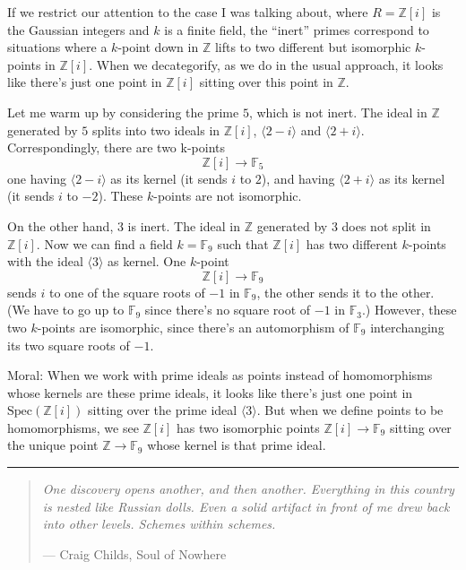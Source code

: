 \documentclass{article}
\begin{document}
If we restrict our attention to the case I was talking about, where
\(R = \mathbb{Z}[i]\) is the Gaussian integers and \(k\) is a finite
field, the ``inert'' primes correspond to situations where a \(k\)-point
down in \(\mathbb{Z}\) lifts to two different but isomorphic
\(k\)-points in \(\mathbb{Z}[i]\). When we decategorify, as we do in the
usual approach, it looks like there's just one point in
\(\mathbb{Z}[i]\) sitting over this point in \(\mathbb{Z}\).

Let me warm up by considering the prime \(5\), which is not inert. The
ideal in \(\mathbb{Z}\) generated by \(5\) splits into two ideals in
\(\mathbb{Z}[i]\), \(\langle 2 - i\rangle\) and
\(\langle 2 + i\rangle\). Correspondingly, there are two k-points
\[\mathbb{Z}[i] \to \mathbb{F}_5\] one having \(\langle 2 - i\rangle\)
as its kernel (it sends \(i\) to \(2\)), and having
\(\langle 2 + i\rangle\) as its kernel (it sends \(i\) to \(-2\)). These
\(k\)-points are not isomorphic.

On the other hand, \(3\) is inert. The ideal in \(\mathbb{Z}\) generated
by \(3\) does not split in \(\mathbb{Z}[i]\). Now we can find a field
\(k = \mathbb{F}_9\) such that \(\mathbb{Z}[i]\) has two different
\(k\)-points with the ideal \(\langle 3\rangle\) as kernel. One
\(k\)-point \[\mathbb{Z}[i] \to \mathbb{F}_9\] sends \(i\) to one of the
square roots of \(-1\) in \(\mathbb{F}_9\), the other sends it to the
other. (We have to go up to \(\mathbb{F}_9\) since there's no square
root of \(-1\) in \(\mathbb{F}_3\).) However, these two \(k\)-points are
isomorphic, since there's an automorphism of \(\mathbb{F}_9\)
interchanging its two square roots of \(-1\).

Moral: When we work with prime ideals as points instead of homomorphisms
whose kernels are these prime ideals, it looks like there's just one
point in \(\mathrm{Spec}(\mathbb{Z}[i])\) sitting over the prime ideal
\(\langle 3\rangle\). But when we define points to be homomorphisms, we
see \(\mathbb{Z}[i]\) has two isomorphic points
\(\mathbb{Z}[i] \to \mathbb{F}_9\) sitting over the unique point
\(\mathbb{Z} \to \mathbb{F}_9\) whose kernel is that prime ideal.

\begin{center}\rule{0.5\linewidth}{0.5pt}\end{center}

\begin{quote}
\emph{One discovery opens another, and then another. Everything in this
country is nested like Russian dolls. Even a solid artifact in front of
me drew back into other levels. Schemes within schemes.}

--- Craig Childs, Soul of Nowhere
\end{quote}
\end{document}
